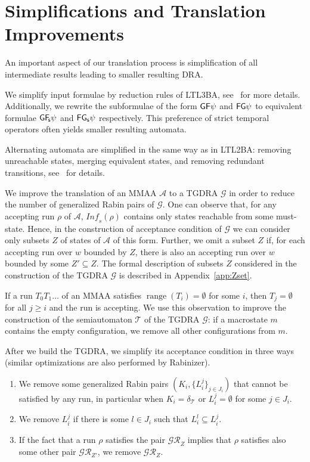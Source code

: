 \documentclass{llncs}
\newcommand{\mA}{\mathcal{A}}
\newcommand{\mG}{\mathcal{G}}
\newcommand{\mGR}{\mathcal{GR}}
\newcommand{\mT}{\mathcal{T}}
\newcommand{\Inf}{\mathit{Inf\!}}
\DeclareMathOperator*{\range}{{range}}
\begin{document}
\section{Simplifications and Translation Improvements}
\label{sec:simplifications}

An important aspect of our translation process is simplification of all
intermediate results leading to smaller resulting DRA.

We simplify input formulae by reduction rules of LTL3BA,
see~\cite{BKRS12} for more details. Additionally, we rewrite the
subformulae of the form $\mathsf{G}\mathsf{F}\psi$ and $\mathsf{F}\mathsf{G}\psi$ to equivalent
formulae $\mathsf{G}{\mathsf{F}\!_\mathsf{s}}\psi$ and $\mathsf{F}{\mathsf{G}_\mathsf{s}}\psi$ respectively. This preference of
strict temporal operators often yields smaller resulting automata.

Alternating automata are simplified in the same way as in LTL2BA: removing
unreachable states, merging equivalent states, and removing redundant
transitions, see~\cite{GO01} for details.

We improve the translation of an MMAA $\mA$ to a TGDRA $\mG$ in order to
reduce the number of generalized Rabin pairs of $\mG$.  One can observe
that, for any accepting run $\rho$ of $\mA$, $\Inf_s(\rho)$ contains
only states reachable from some must-state.  Hence, in the construction of
acceptance condition of $\mG$ we can consider only subsets $Z$ of states
of $\mA$ of this form.  Further, we omit a subset $Z$ if, for each
accepting run over $w$ bounded by $Z$, there is also an accepting run
over $w$ bounded by some $Z'\subseteq Z$.  The formal description of
subsets $Z$ considered in the construction of the TGDRA $\mG$ is described
in Appendix~\ref{app:Zset}.

If a run $T_0T_1\ldots$ of an MMAA satisfies $\range(T_i)=\emptyset$ for
some $i$, then $T_j=\emptyset$ for all $j \geq i$ and the run is accepting.
We use this observation to improve the construction of the semiautomaton
$\mT$ of the TGDRA $\mG$: if a macrostate $m$ contains the empty
configuration, we remove all other configurations from $m$.


After we build the TGDRA, we simplify its acceptance condition in three
ways (similar optimizations are also performed by Rabinizer).
\begin{enumerate}
\item We remove some generalized Rabin pairs $(K_i,\{L_{i}^{j}\}_{j\in J_i})$
  that cannot be satisfied by any run, in particular when $K_i =
  \delta_{\mT}$ or $L_i^j=\emptyset$ for some $j \in J_i$.
\item We remove $L_{i}^{j}$ if there is some $l \in J_i$ such that $L_i^{l} 
\subseteq L_i^j$.
\item If the fact that a run $\rho$ satisfies the pair $\mGR_Z$ implies that
  $\rho$ satisfies also some other pair $\mGR_{Z'}$, we remove $\mGR_Z$.
\end{enumerate}
\end{document}
